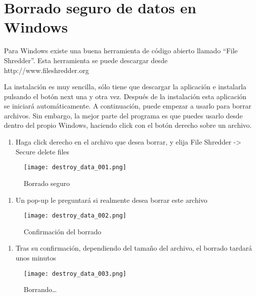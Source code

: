 \documentclass[10pt,a5paper,twoside,,]{book}
\providecommand{\tightlist}{%
  \setlength{\itemsep}{0pt}\setlength{\parskip}{0pt}}
\begin{document}
\section{Borrado seguro de datos en
Windows}\label{borrado-seguro-de-datos-en-windows}

Para Windows existe una buena herramienta de código abierto llamado
``File Shredder''. Esta herramienta se puede descargar desde
http://www.fileshredder.org

La instalación es muy sencilla, sólo tiene que descargar la aplicación e
instalarla pulsando el botón next una y otra vez. Después de la
instalación esta aplicación se iniciará automáticamente. A continuación,
puede empezar a usarlo para borrar archivos. Sin embargo, la mejor parte
del programa es que puedes usarlo desde dentro del propio Windows,
haciendo click con el botón derecho sobre un archivo.

\begin{enumerate}
\def\labelenumi{\arabic{enumi}.}
\tightlist
\item
  Haga click derecho en el archivo que desea borrar, y elija File
  Shredder -\textgreater{} Secure delete files
\end{enumerate}

\begin{figure}[htbp]
\centering
\texttt{[image: destroy\_data\_001.png]}
\caption{Borrado seguro}
\end{figure}

\begin{enumerate}
\def\labelenumi{\arabic{enumi}.}
\setcounter{enumi}{1}
\tightlist
\item
  Un pop-up le preguntará si realmente desea borrar este archivo
\end{enumerate}

\begin{figure}[htbp]
\centering
\texttt{[image: destroy\_data\_002.png]}
\caption{Confirmación del borrado}
\end{figure}

\begin{enumerate}
\def\labelenumi{\arabic{enumi}.}
\setcounter{enumi}{2}
\tightlist
\item
  Tras su confirmación, dependiendo del tamaño del archivo, el borrado
  tardará unos minutos
\end{enumerate}

\begin{figure}[htbp]
\centering
\texttt{[image: destroy\_data\_003.png]}
\caption{Borrando\ldots{}}
\end{figure}
\end{document}
